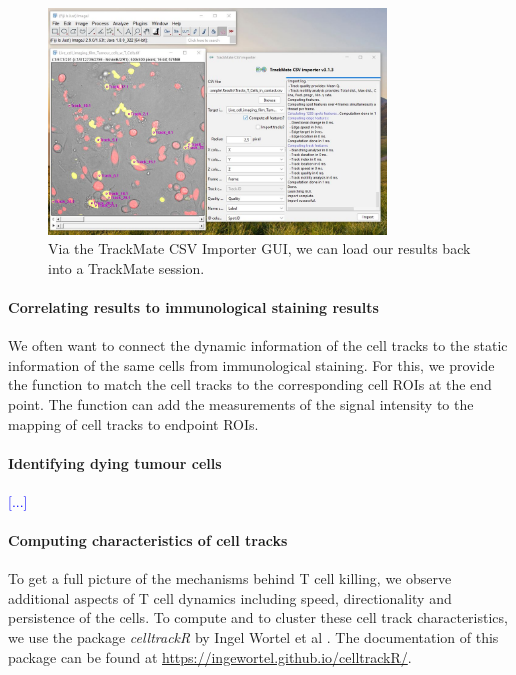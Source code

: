 \documentclass{report}
\begin{document}
\begin{figure}[h!]
\centering
\includegraphics[width=0.8\textwidth]{Screenshot_TrackMate_CSV_Importer.JPG}
\caption[TrackMate_CSV_Importer]{Via the TrackMate CSV Importer GUI, we can load our results back into a TrackMate session. \label{TrackMate_CSV_Importer}}
\end{figure}

\paragraph{Correlating results to immunological staining results}
We often want to connect the dynamic information of the cell tracks to the static information of the same cells from immunological staining. For this, we provide the function  to match the cell tracks to the corresponding cell ROIs at the end point. The function  can add the measurements of the signal intensity to the mapping of cell tracks to endpoint ROIs.

\paragraph{Identifying dying tumour cells}
\textcolor{blue}{[...]}

\paragraph{Computing characteristics of cell tracks} To get a full picture of the mechanisms behind T cell killing, we observe additional aspects of T cell dynamics including speed, directionality and persistence of the cells. To compute and to cluster these cell track characteristics, we use the package \textit{celltrackR} by Ingel Wortel et al \citep{RN299}. The documentation of this package can be found at \url{https://ingewortel.github.io/celltrackR/}.
\end{document}
